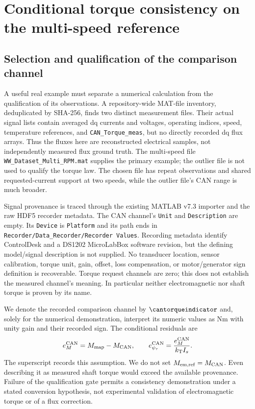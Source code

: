 \section{Conditional torque consistency on the multi-speed reference}
\label{sec:real-torque}
\subsection{Selection and qualification of the comparison channel}
A useful real example must separate a numerical calculation from the
qualification of its observations. A repository-wide MAT-file inventory,
deduplicated by SHA-256, finds two distinct measurement files.
Their actual signal lists contain averaged dq currents and voltages,
operating indices, speed, temperature references, and
\texttt{CAN\_Torque\_meas}, but no directly recorded dq flux arrays.
Thus the fluxes here are reconstructed electrical samples, not independently
measured flux ground truth. The multi-speed file
\texttt{WW\_Dataset\_Multi\_RPM.mat} supplies the primary example;
the outlier file is not used to qualify the torque law.
The chosen file has repeat observations and shared requested-current
support at two speeds, while the outlier file's CAN range is much broader.

Signal provenance is traced through the existing MATLAB v7.3 importer and
the raw HDF5 recorder metadata. The CAN channel's \texttt{Unit} and
\texttt{Description} are empty. Its \texttt{Device} is \texttt{Platform}
and its path ends in
\texttt{Recorder/Data\_Recorder/Recorder Values}.
Recording metadata identify ControlDesk and a DS1202 MicroLabBox software
revision, but the defining model/signal description is not supplied.
No transducer location, sensor calibration, torque unit, gain, offset,
loss compensation, or motor/generator sign definition is recoverable.
Torque request channels are zero; this does not establish the measured
channel's meaning. In particular neither electromagnetic nor shaft torque
is proven by its name.

We denote the recorded comparison channel by $\cantorqueindicator$ and,
solely for the numerical demonstration, interpret its numeric values as
Nm with unity gain and their recorded sign. The conditional residuals are
\begin{equation}
 e_M^{\rm CAN}=M_{\rm map}-M_{\rm CAN},\qquad
 e_{\psi_\tau}^{\rm CAN}=\frac{e_M^{\rm CAN}}{k_{\rm T}I_s}.
 \label{eq:conditional-can-residual}
\end{equation}
The superscript records this assumption. We do not set
$M_{\rm em,ref}=M_{\rm CAN}$. Even describing it as measured shaft torque
would exceed the available provenance. Failure of the qualification gate
permits a consistency demonstration under a stated conversion hypothesis,
not experimental validation of electromagnetic torque or of a flux correction.

